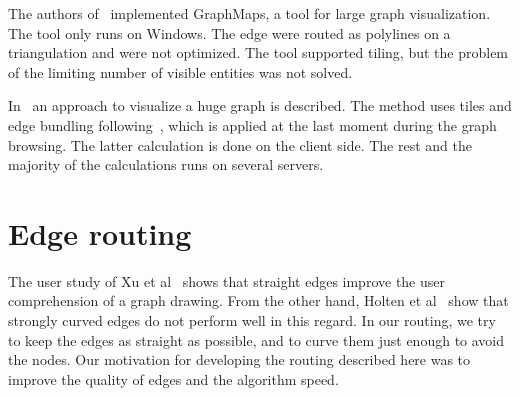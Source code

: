 \documentclass{gd-llncs}
\begin{document}
The authors of~\cite{nachmanson2015graphmaps} implemented GraphMaps, a tool for large graph visualization.
The tool only runs on Windows. The edge were routed as polylines on a triangulation and were not optimized.
The tool supported tiling, but the problem of the limiting number of visible entities was not solved.

In~\cite{perrot2018cornac} an approach to visualize a huge graph is described. The method uses tiles and
edge bundling following~\cite{hurter2012graph}, which is applied at the last moment during the graph browsing.
The latter calculation is done on the client side. The rest and the majority of the calculations runs on several servers.




\section*{Edge routing}
The user study of Xu et al~\cite{xu2012user} shows that straight edges improve the user comprehension of a graph drawing.
From the other hand, Holten et al~\cite{holten2009user} show that strongly curved edges do not perform well in this regard.
In our routing, we try to keep the edges as straight as possible, and to curve them just enough to avoid the nodes.
Our motivation for developing the routing described here was to improve the quality of edges and the algorithm speed.
\end{document}
